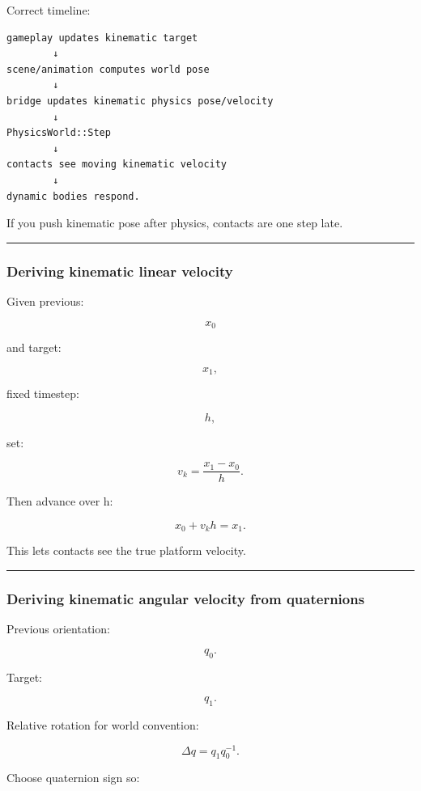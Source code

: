 Correct timeline:

\begin{verbatim}
gameplay updates kinematic target
        ↓
scene/animation computes world pose
        ↓
bridge updates kinematic physics pose/velocity
        ↓
PhysicsWorld::Step
        ↓
contacts see moving kinematic velocity
        ↓
dynamic bodies respond.
\end{verbatim}

If you push kinematic pose after physics, contacts are one step late.

\begin{center}\rule{0.5\linewidth}{0.5pt}\end{center}

\subsubsection{Deriving kinematic linear velocity}\label{deriving-kinematic-linear-velocity}

Given previous:

\[
x_0
\]

and target:

\[
x_1,
\]

fixed timestep:

\[
h,
\]

set:

\[
\boxed{
v_k
=
\frac{x_1-x_0}{h}.
}
\]

Then advance over h:

\[
x_0+v_kh=x_1.
\]

This lets contacts see the true platform velocity.

\begin{center}\rule{0.5\linewidth}{0.5pt}\end{center}

\subsubsection{Deriving kinematic angular velocity from quaternions}\label{deriving-kinematic-angular-velocity-from-quaternions}

Previous orientation:

\[
q_0.
\]

Target:

\[
q_1.
\]

Relative rotation for world convention:

\[
\Delta q
=
q_1q_0^{-1}.
\]

Choose quaternion sign so:

